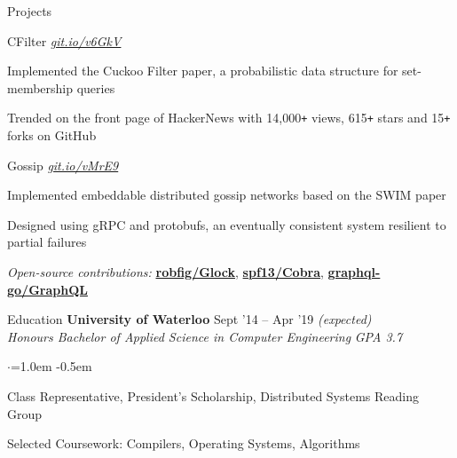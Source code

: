 \documentclass{resume} %
\begin{document}

\begin{rSection}{Projects}
  \begin{rSubsection}{CFilter}
                     {\em{\href{https://git.io/v6GkV}{git.io/v6GkV}}}{}

    \item Implemented the Cuckoo Filter paper, a probabilistic data structure for
      set-membership queries
    \item Trended on the front page of HackerNews with 14,000\texttt{+} views,
      615\texttt{+} stars and 15\texttt{+} forks on GitHub
  \end{rSubsection}

  \begin{rSubsection}{Gossip}
                     {\em{\href{https://git.io/vMrE9}{git.io/vMrE9}}}{}

    \item Implemented embeddable distributed gossip networks based on the SWIM
      paper
    \item Designed using gRPC and protobufs, an eventually consistent system
      resilient to partial failures
  \end{rSubsection}

  \begin{rMinisection}
    \item {\em Open-source contributions:}
      \href{https://github.com/robfig/glock}{\textbf{robfig/Glock}},
      \href{https://github.com/spf13/cobra}{\textbf{spf13/Cobra}},
      \href{https://github.com/graphql-go/graphql}{\textbf{graphql-go/GraphQL}}
  \end{rMinisection}
\end{rSection}


\begin{rSection}{Education}
  {\bf University of Waterloo} \hfill {Sept '14 -- Apr '19 \em (expected)} \\
  {\em Honours Bachelor of Applied Science in Computer Engineering} \hfill {\em GPA 3.7}
  \begin{list}{$\cdot$}{\leftmargin=1.0em}
  \itemsep -0.5em \vspace{-0.5em}
    \item Class Representative, President's Scholarship, Distributed Systems Reading Group
    \item Selected Coursework: Compilers, Operating Systems, Algorithms
  \end{list}
  \vspace{0.5em}
\end{rSection}
\end{document}
